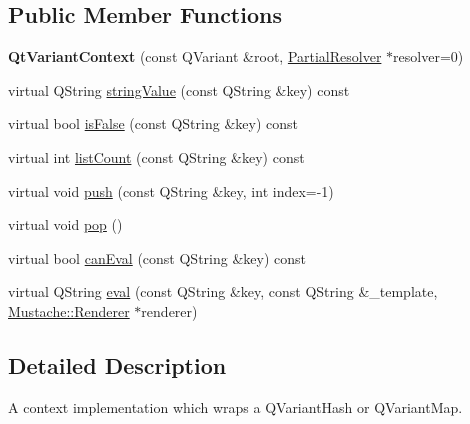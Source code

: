 \subsection*{Public Member Functions}
\begin{DoxyCompactItemize}
\item 
\hypertarget{classMustache_1_1QtVariantContext_ac9eff9d97c00dbcad6b38670327050ee}{{\bfseries Qt\-Variant\-Context} (const Q\-Variant \&root, \hyperlink{classMustache_1_1PartialResolver}{Partial\-Resolver} $\ast$resolver=0)}\label{classMustache_1_1QtVariantContext_ac9eff9d97c00dbcad6b38670327050ee}

\item 
virtual Q\-String \hyperlink{classMustache_1_1QtVariantContext_a55b19269efa6924edf21118ab0b49e08}{string\-Value} (const Q\-String \&key) const 
\item 
virtual bool \hyperlink{classMustache_1_1QtVariantContext_af5f93b6ff7ac3c24928757a2af1b8820}{is\-False} (const Q\-String \&key) const 
\item 
virtual int \hyperlink{classMustache_1_1QtVariantContext_aa055fefa606e0958549cb4671e628e9c}{list\-Count} (const Q\-String \&key) const 
\item 
virtual void \hyperlink{classMustache_1_1QtVariantContext_aa5164d437812877c96faa833d8ce5eac}{push} (const Q\-String \&key, int index=-\/1)
\item 
virtual void \hyperlink{classMustache_1_1QtVariantContext_adfb3067d5cf209e4203a0b1754008efc}{pop} ()
\item 
virtual bool \hyperlink{classMustache_1_1QtVariantContext_a2671990a3c9d8d4d7b626fa85b841ab2}{can\-Eval} (const Q\-String \&key) const 
\item 
virtual Q\-String \hyperlink{classMustache_1_1QtVariantContext_a0602be333afa1d4fa89c2c5820311bf1}{eval} (const Q\-String \&key, const Q\-String \&\-\_\-template, \hyperlink{classMustache_1_1Renderer}{Mustache\-::\-Renderer} $\ast$renderer)
\end{DoxyCompactItemize}


\subsection{Detailed Description}
A context implementation which wraps a Q\-Variant\-Hash or Q\-Variant\-Map. 

